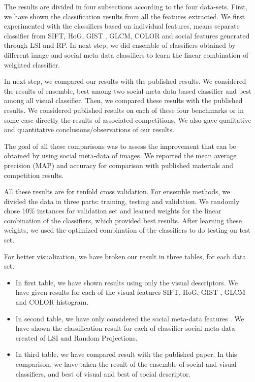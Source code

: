 The results are divided in four subsections according to the four data-sets. First, we have shown  the classification results from all the features  extracted. We first experimented with the classifiers based on individual features, means separate classifier from SIFT, HoG, 
GIST , GLCM, COLOR and social features generated through LSI and RP. In next step, we did ensemble of classifiers obtained by different image and social meta data classifiers to learn the linear combination of weighted classifier.

In next step, we compared our results with the published results. We considered the results of ensemble, best among two social meta data based classifier and best among all visual classifier. Then, we compared these results with the published results. We considered  published results on each of these four benchmarks or in some case directly the results of associated competitions. We also gave qualitative and quantitative conclusions/observations  of our results. 

The goal of all these comparisons was to assess the improvement that can be obtained by using social meta-data of images. We reported the mean average precision (MAP) and accuracy for comparison with published materials and competition results. 

All these results are for tenfold cross validation. For ensemble methods, we divided the data in three parts: training, testing and validation. We randomly chose 10\% instances for validation set and learned weights for the linear combination of the classifiers, which provided best results. After learning these weights, we used the optimized combination of the classifiers to do testing on test set.

For better visualization, we have broken our result in three tables, for each data set.
\begin{itemize}
\item In first table, we have shown results using only the visual descriptors. We have given results for each of the visual features SIFT, HoG, GIST , GLCM and COLOR histogram.
\item In second table, we have only considered the social meta-data features . We have shown the classification result for each of classifier social meta data created of LSI and Random Projections.
\item In third table, we have compared result with the published paper. In this comparison, we have taken the result of the ensemble of social and visual classifiers, and best of visual and best of social descriptor.
\end{itemize}

